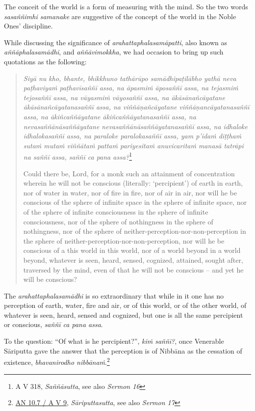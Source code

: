The conceit of the world is a form of measuring with the mind. So the two words \emph{sasaññimhi samanake} are suggestive of the concept of the world in the Noble Ones' discipline.

While discussing the significance of \emph{arahattaphalasamāpatti}, also known as \emph{aññāphalasamādhi}, and \emph{aññāvimokkha}, we had occasion to bring up such quotations as the following:

\begin{quote}
\emph{Siyā nu kho, bhante, bhikkhuno tathārūpo samādhipaṭilābho yathā neva paṭhaviyaṁ paṭhavīsaññī assa, na āpasmiṁ āposaññī assa, na tejasmiṁ tejosaññī assa, na vāyasmiṁ vāyosaññī assa, na ākāsānañcāyatane ākāsānañcāyatanasaññī assa, na viññāṇañcāyatane viññāṇancāyatanasaññī assa, na ākiñcaññāyatane ākiñcaññāyatanasaññī assa, na nevasaññānāsaññāyatane nevasaññānāsaññāyatanasaññī assa, na idhaloke idhalokasaññī assa, na paraloke paralokasaññī assa, yam p'idaṁ diṭṭhaṁ sutaṁ mutaṁ viññātaṁ pattaṁ pariyesitaṁ anuvicaritaṁ manasā tatrāpi na saññī assa, saññī ca pana assa?}\footnote{A V 318, \emph{Saññāsutta}, see also \emph{Sermon 16}}

Could there be, Lord, for a monk such an attainment of concentration wherein he will not be conscious (literally: `percipient') of earth in earth, nor of water in water, nor of fire in fire, nor of air in air, nor will he be conscious of the sphere of infinite space in the sphere of infinite space, nor of the sphere of infinite consciousness in the sphere of infinite consciousness, nor of the sphere of nothingness in the sphere of nothingness, nor of the sphere of neither-perception-nor-non-perception in the sphere of neither-perception-nor-non-perception, nor will he be conscious of a this world in this world, nor of a world beyond in a world beyond, whatever is seen, heard, sensed, cognized, attained, sought after, traversed by the mind, even of that he will not be conscious -- and yet he will be conscious?
\end{quote}

The \emph{arahattaphalasamādhi} is so extraordinary that while in it one has no perception of earth, water, fire and air, or of this world, or of the other world, of whatever is seen, heard, sensed and cognized, but one is all the same percipient or conscious, \emph{saññī ca pana assa}.

To the question: ``Of what is he percipient?'', \emph{kiṁ saññī?}, once Venerable Sāriputta gave the answer that the perception is of Nibbāna as the cessation of existence, \emph{bhavanirodho nibbānaṁ}.\footnote{\href{https://suttacentral.net/an10.7/pli/ms}{AN 10.7 / A V 9}, \emph{Sāriputtasutta}, see also \emph{Sermon 17}}

